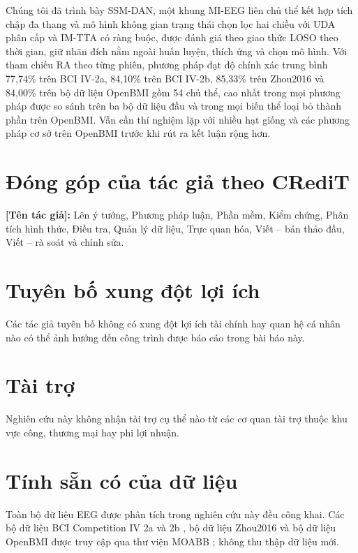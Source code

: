 \documentclass[preprint,12pt]{elsarticle}
\begin{document}
Chúng tôi đã trình bày SSM-DAN, một khung MI-EEG liên chủ thể kết hợp tích chập đa thang và mô hình không gian trạng thái chọn lọc hai chiều với UDA phân cấp và IM-TTA có ràng buộc, được đánh giá theo giao thức LOSO theo thời gian, giữ nhãn đích nằm ngoài huấn luyện, thích ứng và chọn mô hình. Với tham chiếu RA theo từng phiên, phương pháp đạt độ chính xác trung bình 77,74\% trên BCI IV-2a, 84,10\% trên BCI IV-2b, 85,33\% trên Zhou2016 và 84,00\% trên bộ dữ liệu OpenBMI gồm 54 chủ thể, cao nhất trong mọi phương pháp được so sánh trên ba bộ dữ liệu đầu và trong mọi biến thể loại bỏ thành phần trên OpenBMI. Vẫn cần thí nghiệm lặp với nhiều hạt giống và các phương pháp cơ sở trên OpenBMI trước khi rút ra kết luận rộng hơn.

\section*{Đóng góp của tác giả theo CRediT}
\textbf{[Tên tác giả]:} Lên ý tưởng, Phương pháp luận, Phần mềm, Kiểm chứng, Phân tích hình thức, Điều tra, Quản lý dữ liệu, Trực quan hóa, Viết -- bản thảo đầu, Viết -- rà soát và chỉnh sửa.

\section*{Tuyên bố xung đột lợi ích}
Các tác giả tuyên bố không có xung đột lợi ích tài chính hay quan hệ cá nhân nào có thể ảnh hưởng đến công trình được báo cáo trong bài báo này.

\section*{Tài trợ}
Nghiên cứu này không nhận tài trợ cụ thể nào từ các cơ quan tài trợ thuộc khu vực công, thương mại hay phi lợi nhuận.

\section*{Tính sẵn có của dữ liệu}
Toàn bộ dữ liệu EEG được phân tích trong nghiên cứu này đều công khai. Các bộ dữ liệu BCI Competition IV 2a và 2b \cite{tangermann2012review}, bộ dữ liệu Zhou2016 \cite{zhou2016trialselection} và bộ dữ liệu OpenBMI \cite{lee2019openbmi} được truy cập qua thư viện MOABB \cite{jayaram2018moabb}; không thu thập dữ liệu mới.



\end{document}
